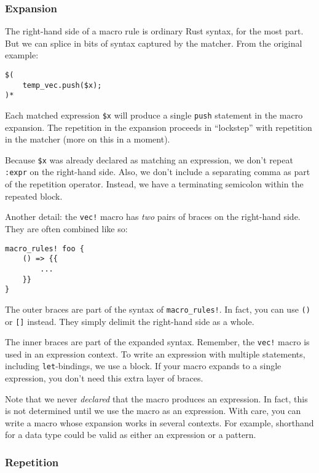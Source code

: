 \documentclass[a4paper,]{book}
\begin{document}
\subsubsection{Expansion}\label{expansion}

The right-hand side of a macro rule is ordinary Rust syntax, for the
most part. But we can splice in bits of syntax captured by the matcher.
From the original example:

\begin{verbatim}
$(
    temp_vec.push($x);
)*
\end{verbatim}

Each matched expression \texttt{\$x} will produce a single \texttt{push}
statement in the macro expansion. The repetition in the expansion
proceeds in ``lockstep'' with repetition in the matcher (more on this in
a moment).

Because \texttt{\$x} was already declared as matching an expression, we
don't repeat \texttt{:expr} on the right-hand side. Also, we don't
include a separating comma as part of the repetition operator. Instead,
we have a terminating semicolon within the repeated block.

Another detail: the \texttt{vec!} macro has \emph{two} pairs of braces
on the right-hand side. They are often combined like so:

\begin{verbatim}
macro_rules! foo {
    () => {{
        ...
    }}
}
\end{verbatim}

The outer braces are part of the syntax of \texttt{macro\_rules!}. In
fact, you can use \texttt{()} or \texttt{{[}{]}} instead. They simply
delimit the right-hand side as a whole.

The inner braces are part of the expanded syntax. Remember, the
\texttt{vec!} macro is used in an expression context. To write an
expression with multiple statements, including \texttt{let}-bindings, we
use a block. If your macro expands to a single expression, you don't
need this extra layer of braces.

Note that we never \emph{declared} that the macro produces an
expression. In fact, this is not determined until we use the macro as an
expression. With care, you can write a macro whose expansion works in
several contexts. For example, shorthand for a data type could be valid
as either an expression or a pattern.

\subsubsection{Repetition}\label{repetition}
\end{document}
